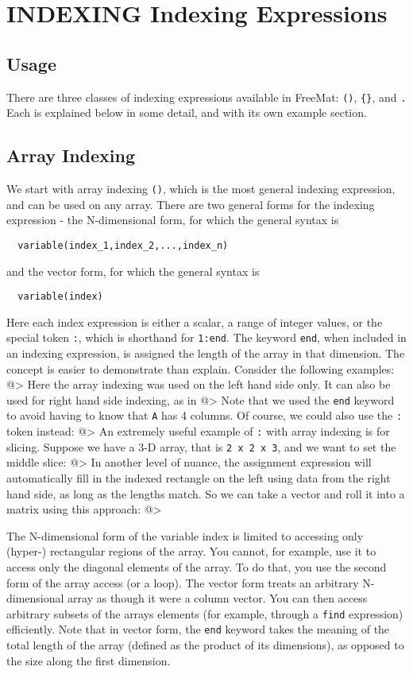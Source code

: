\section{INDEXING Indexing Expressions}

\subsection{Usage}

There are three classes of indexing expressions available 
in FreeMat: \verb|()|, \verb|{}|, and \verb|.|  Each is explained below
in some detail, and with its own example section.
\subsection{Array Indexing}

We start with array indexing \verb|()|,
which is the most general indexing expression, and can be
used on any array.  There are two general forms for the 
indexing expression - the N-dimensional form, for which 
the general syntax is
\begin{verbatim}
  variable(index_1,index_2,...,index_n)
\end{verbatim}
and the vector form, for which the general syntax is
\begin{verbatim}
  variable(index)
\end{verbatim}
Here each index expression is either a scalar, a range
of integer values, or the special token \verb|:|, which is
shorthand for \verb|1:end|.  The keyword \verb|end|, when included
in an indexing expression, is assigned the length of the 
array in that dimension.  The concept is easier to demonstrate
than explain.  Consider the following examples:
@>
Here the array indexing was used on the left hand side only.
It can also be used for right hand side indexing, as in
@>
Note that we used the \verb|end| keyword to avoid having to know
that \verb|A| has 4 columns.  Of course, we could also use the 
\verb|:| token instead:
@>
An extremely useful example of \verb|:| with array indexing is for
slicing.  Suppose we have a 3-D array, that is \verb|2 x 2 x 3|,
and we want to set the middle slice:
@>
In another level of nuance, the assignment expression will
automatically fill in the indexed rectangle on the left using
data from the right hand side, as long as the lengths match.
So we can take a vector and roll it into a matrix using this
approach:
@>

The N-dimensional form of the variable index is limited
to accessing only (hyper-) rectangular regions of the 
array.  You cannot, for example, use it to access only
the diagonal elements of the array.  To do that, you use
the second form of the array access (or a loop).  The
vector form treats an arbitrary N-dimensional array as though
it were a column vector.  You can then access arbitrary 
subsets of the arrays elements (for example, through a \verb|find|
expression) efficiently.  Note that in vector form, the \verb|end|
keyword takes the meaning of the total length of the array
(defined as the product of its dimensions), as opposed to the
size along the first dimension.
